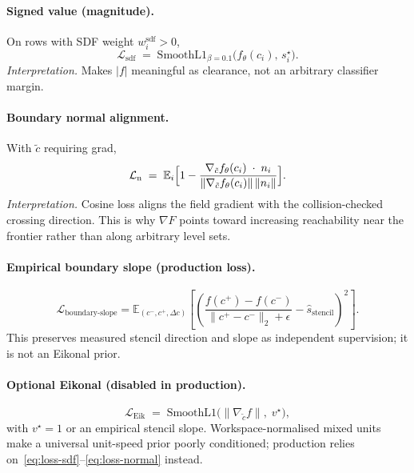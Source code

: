 \documentclass[11pt,a4paper]{article}
\begin{document}
\paragraph{Signed value (magnitude).}
On rows with SDF weight \(w_{i}^{\mathrm{sdf}}>0\),
\begin{equation}
\label{eq:loss-sdf}
  \mathcal{L}_{\mathrm{sdf}}
  \;=\;
  \mathrm{SmoothL1}_{\beta=0.1}
  \bigl(f_{\theta}(c_{i}),\, s_{i}^{\star}\bigr).
\end{equation}
\emph{Interpretation.}
Makes \(|f|\) meaningful as clearance, not an arbitrary classifier margin.

\paragraph{Boundary normal alignment.}
With \(\tilde c\) requiring grad,
\begin{equation}
\label{eq:loss-normal}
  \mathcal{L}_{\mathrm{n}}
  \;=\;
  \mathbb{E}_{i}\Bigl[
    1
    -
    \frac{
      \nabla_{\tilde c}f_{\theta}(c_{i})
      \;\cdot\;
      n_{i}
    }{
      \|\nabla_{\tilde c}f_{\theta}(c_{i})\|\,\|n_{i}\|
    }
  \Bigr].
\end{equation}
\emph{Interpretation.}
Cosine loss aligns the field gradient with the collision-checked crossing
direction. This is why \(\nabla F\) points toward increasing reachability
near the frontier rather than along arbitrary level sets.

\paragraph{Empirical boundary slope (production loss).}
\begin{equation}
\label{eq:loss-boundary-slope}
  \mathcal{L}_{\mathrm{boundary\text{-}slope}}
  = \mathbb{E}_{(c^-,c^+,\Delta c)}
    \left[\left(
      \frac{f(c^+)-f(c^-)}{\|c^+-c^-\|_2+\epsilon}
      - \widehat{s}_{\mathrm{stencil}}
    \right)^2\right].
\end{equation}
This preserves measured stencil direction and slope as independent
supervision; it is not an Eikonal prior.

\paragraph{Optional Eikonal (disabled in production).}
\begin{equation}
\label{eq:loss-eikonal}
  \mathcal{L}_{\mathrm{Eik}}
  \;=\;
  \mathrm{SmoothL1}\bigl(
    \|\nabla_{\tilde c}f\|,\;
    v^{\star}
  \bigr),
\end{equation}
with \(v^{\star}=1\) or an empirical stencil slope. Workspace-normalised
mixed units make a universal unit-speed prior poorly conditioned; production
relies on~\eqref{eq:loss-sdf}--\eqref{eq:loss-normal} instead.
\end{document}
